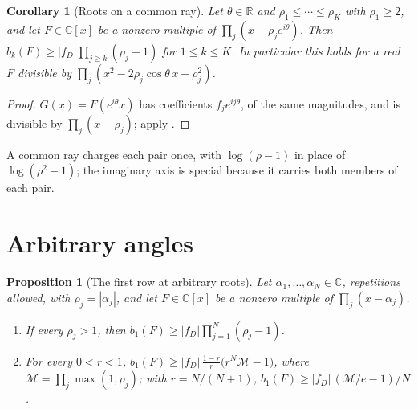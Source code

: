 \documentclass[11pt]{article}
\newtheorem{corollary}[theorem]{Corollary}
\newtheorem{proposition}[theorem]{Proposition}
\newcommand{\R}{\mathbb R}
\begin{document}
\begin{corollary}[Roots on a common ray]\label{cor:ray}
Let $\theta\in\R$ and $\rho_1\le\cdots\le\rho_K$ with $\rho_1\ge2$, and let
$F\in\mathbb C[x]$ be a nonzero multiple of $\prod_j(x-\rho_je^{i\theta})$.  Then
$b_k(F)\ge|f_D|\prod_{j\ge k}(\rho_j-1)$ for $1\le k\le K$.  In
particular this holds for a real $F$ divisible by
$\prod_j(x^2-2\rho_j\cos\theta\,x+\rho_j^2)$.
\end{corollary}

\begin{proof}
$G(x)=F(e^{i\theta}x)$ has coefficients $f_je^{ij\theta}$, of the same
magnitudes, and is divisible by $\prod_j(x-\rho_j)$; apply
\cite[Corollary~3.3]{coefficient-mass}.
\end{proof}

A common ray charges each pair once, with $\log(\rho-1)$ in place of
$\log(\rho^2-1)$; the imaginary axis is special because it carries both
members of each pair.


\section{Arbitrary angles}\label{sec:angles}

\begin{proposition}[The first row at arbitrary roots]\label{prop:rowone}
Let $\alpha_1,\ldots,\alpha_N\in\mathbb C$, repetitions allowed, with
$\rho_j=|\alpha_j|$, and let $F\in\mathbb C[x]$ be a nonzero multiple of
$\prod_j(x-\alpha_j)$.
\begin{enumerate}
\item If every $\rho_j>1$, then $b_1(F)\ge|f_D|\prod_{j=1}^N(\rho_j-1)$.
\item For every $0<r<1$,
$b_1(F)\ge|f_D|\,\frac{1-r}{r}\bigl(r^N\mathcal M-1\bigr)$, where
$\mathcal M=\prod_j\max(1,\rho_j)$; with $r=N/(N+1)$,
$b_1(F)\ge|f_D|\,(\mathcal M/e-1)/N$.
\end{enumerate}
\end{proposition}
\end{document}
